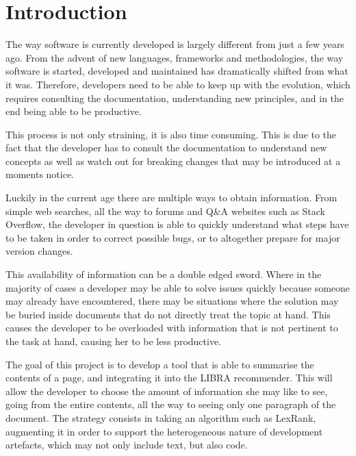 \section{Introduction}\label{sec:introduction}
The way software is currently developed is largely different from just a few years ago. From the advent of new languages, frameworks and methodologies, the way software is started, developed and maintained has dramatically shifted from what it was. Therefore, developers need to be able to keep up with the evolution, which requires consulting the documentation, understanding new principles, and in the end being able to be productive. 

This process is not only straining, it is also time consuming. This is due to the fact that the developer has to consult the documentation to understand new concepts as well as watch out for breaking changes that may be introduced at a moments notice. 

Luckily in the current age there are multiple ways to obtain information. From simple web searches, all the way to forums and Q\&A websites such as Stack Overflow, the developer in question is able to quickly understand what steps have to be taken in order to correct possible bugs, or to altogether prepare for major version changes. 

This availability of information can be a double edged sword. Where in the majority of cases a developer may be able to solve issues quickly because someone may already have encountered, there may be situations where the solution may be buried inside documents that do not directly treat the topic at hand. This causes the developer to be overloaded with information that is not pertinent to the task at hand, causing her to be less productive.

The goal of this project is to develop a tool that is able to summarise the contents of a page, and integrating it into the LIBRA\cite{Ponz2017a} recommender. This will allow the developer to choose the amount of information she may like to see, going from the entire contents, all the way to seeing only one paragraph of the document. The strategy consists in taking an algorithm such as LexRank, augmenting it in order to support the heterogeneous nature of development artefacts, which may not only include text, but also code.